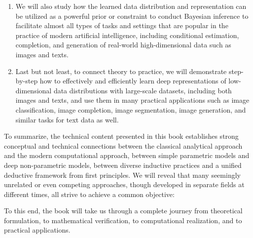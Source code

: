 \documentclass[../../book-main.tex]{subfiles}
\begin{document}
\begin{enumerate}
\item We will also study how the learned data distribution and representation can be utilized as a powerful prior or constraint to conduct Bayesian inference to facilitate almost all types of tasks and settings that are popular in the practice of modern artificial intelligence, including conditional estimation, completion, and generation of real-world high-dimensional data such as images and texts. 

\item Last but not least, to connect theory to practice, we will demonstrate step-by-step how to effectively and efficiently learn deep representations of low-dimensional data distributions with large-scale datasets, including both images and texts, and use them in many practical applications such as image classification, image completion, image segmentation, image generation, and similar tasks for text data as well. 
\end{enumerate}

To summarize, the technical content presented in this book establishes strong conceptual and technical connections between the classical analytical approach and the modern computational approach, between simple parametric models and deep non-parametric models, between diverse inductive practices and a unified deductive framework from first principles. We will reveal that many seemingly unrelated or even competing approaches, though developed in separate fields at different times, all strive to achieve a common objective: 
\begin{quote}
\end{quote}
To this end, the book will take us through a complete journey from theoretical formulation, to mathematical verification, to computational realization, and to practical applications.
\end{document}

